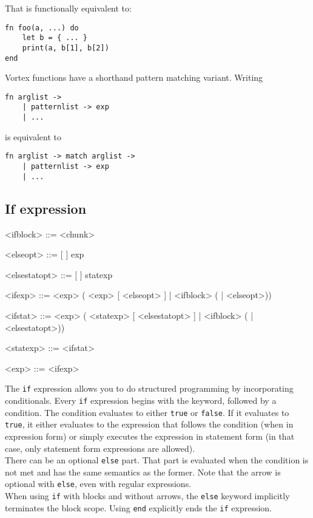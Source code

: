 \documentclass{article}
\newenvironment{bnf}
{
\begin{mdframed}
\begin{grammar}
}
{
\end{grammar}
\end{mdframed}
}
\begin{document}
That is functionally equivalent to:
\begin{lstlisting}[language=vortex]
fn foo(a, ...) do
    let b = { ... }
    print(a, b[1], b[2])
end
\end{lstlisting}
Vortex functions have a shorthand pattern matching variant. Writing
\begin{lstlisting}[language=vortex]
fn arglist ->
    | patternlist -> exp
    | ...
\end{lstlisting}
is equivalent to
\begin{lstlisting}[language=vortex]
fn arglist -> match arglist ->
    | patternlist -> exp
    | ...
\end{lstlisting}
\subsection{If expression}
\begin{bnf}
<ifblock> ::=  <chunk>

<elseopt> ::=  [ \lit{->} ] exp

<elsestatopt> ::=  [ \lit{->} ] statexp

<ifexp> ::=  <exp> (\lit{->} <exp> [ <elseopt> ] |
    <ifblock> ( | <elseopt>))

<ifstat> ::=  <exp> (\lit{->} <statexp> [ <elsestatopt> ] |
    <ifblock> ( | <elsestatopt>))

<statexp> ::= <ifstat>

<exp> ::= <ifexp>
\end{bnf}
The \verb|if| expression allows you to do structured programming by
incorporating conditionals. Every \verb|if| expression begins with the
keyword, followed by a condition. The condition evaluates to either \verb|true|
or \verb|false|. If it evaluates to \verb|true|, it either evaluates to the
expression that follows the condition (when in expression form) or simply
executes the expression in statement form (in that case, only statement
form expressions are allowed).\\
There can be an optional \verb|else| part. That part is evaluated when the
condition is not met and has the same semantics as the former. Note that the
arrow is optional with \verb|else|, even with regular expressions.\\
When using \verb|if| with blocks and without arrows, the \verb|else| keyword
implicitly terminates the block scope. Using \verb|end| explicitly ends the
\verb|if| expression.
\end{document}
